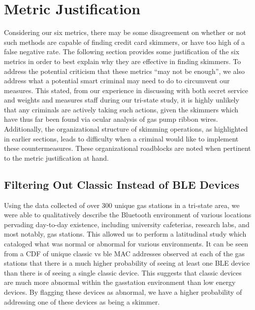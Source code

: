 \section{Metric Justification}
\label{sec: metricjustification}

Considering our six metrics, there may be some disagreement on whether or not
such methods are capable of finding credit card skimmers, or have too high
of a false negative rate. The following section provides some justification
of the six metrics in order to best explain why they are effective in finding
skimmers. To address the potential criticism that these metrics ``may not be
enough'', we also address what a potential smart criminal may need to do to
circumvent our measures. This stated, from our experience in discussing with
both secret service and weights and measures staff during our tri-state study,
it is highly unlikely that any criminals are actively taking such actions, given
the skimmers which have thus far been found via ocular analysis of gas pump
ribbon wires. Additionally, the organizational structure of skimming
operations, as highlighted in earlier sections, leads to difficulty when a
criminal would like to implement these countermeasures. These organizational
roadblocks are noted when pertinent to the metric justification at hand.

\subsection{Filtering Out Classic Instead of BLE Devices}

Using the data collected of over 300 unique gas stations in a tri-state area, we
were able to qualitatively describe the Bluetooth environment of various locations
pervading day-to-day existence, including university cafeterias, research labs, and
most notably, gas stations. This allowed us to perform a latitudinal study which cataloged
what was normal or abnormal for various environments. It can be seen from a CDF of unique
classic vs ble MAC addresses observed at each of the gas stations that there is a much higher
probability of seeing at least one BLE device than there is of seeing a single classic device.
This suggests that classic devices are much more abnormal within the gasstation environment
than low energy devices. By flagging these devices as abnormal, we have a higher probability of
addressing one of these devices as being a skimmer.


